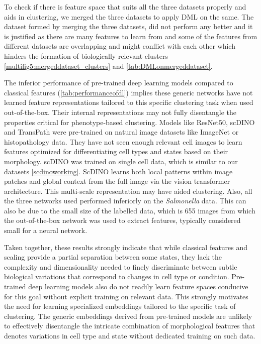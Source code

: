 \documentclass[12pt,a4paper]{article}
\begin{document}
To check if there is feature space that suits all the three datasets properly and aids in clustering, we merged the three datasets to apply DML on the same. The dataset formed by merging the three datasets, did not perform any better and it is justified as there are many features to learn from and some of the features from different datasets are overlapping and might conflict with each other which hinders the formation of biologically relevant clusters \ref{multifig5:mergeddataset_clusters} and \ref{tab:DMLonmergeddataset}.

The inferior performance of pre-trained deep learning models compared to classical features (\ref{tab:performanceofdl}) implies these generic networks have not learned feature representations tailored to this specific clustering task when used out-of-the-box. Their internal representations may not fully disentangle the properties critical for phenotype-based clustering. Models like ResNet50, scDINO and TransPath were pre-trained on natural image datasets like ImageNet or histopathology data. They have not seen enough relevant cell images to learn features optimized for differentiating cell types and states based on their morphology. scDINO was trained on single cell data, which is similar to our datasets \ref{scdinoworking}. ScDINO learns both local patterns within image patches and global context from the full image via the vision transformer architecture. This multi-scale representation may have aided clustering. Also, all the three networks used performed inferiorly on the \textit{Salmonella} data. This can also be due to the small size of the labelled data, which is 655 images from which the out-of-the-box network was used to extract features, typically considered small for a neural network.

Taken together, these results strongly indicate that while classical features and scaling provide a partial separation between some states, they lack the complexity and dimensionality needed to finely discriminate between subtle biological variations that correspond to changes in cell type or condition. Pre-trained deep learning models also do not readily learn feature spaces conducive for this goal without explicit training on relevant data. This strongly motivates the need for learning specialized embeddings tailored to the specific task of clustering. The generic embeddings derived from pre-trained models are unlikely to effectively disentangle the intricate combination of morphological features that denotes variations in cell type and state without dedicated training on such data. 
\end{document}
